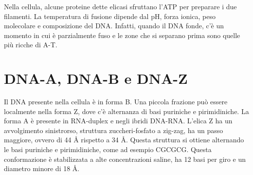 
Nella cellula, alcune proteine dette elicasi sfruttano l'ATP per preparare i due filamenti.
La temperatura di fusione dipende dal pH, forza ionica, peso molecolare e composizione del DNA.
Infatti, quando il DNA fonde, c'è un momento in cui è parzialmente fuso e le zone che si separano prima sono quelle più ricche di A-T.



\clearpage

\section{DNA-A, DNA-B e DNA-Z}

\begingroup
\begin{table}
\caption{Tipologie di DNA}
\end{table}
\endgroup

Il DNA presente nella cellula è in forma B. Una piccola frazione può essere localmente nella forma Z, dove c'è alternanza di basi puriniche e pirimidiniche. La forma A è presente in RNA-duplex e negli ibridi DNA-RNA.
L'elica Z ha un avvolgimento sinistrorso, struttura zuccheri-fosfato a zig-zag, ha un passo maggiore, ovvero di 44 \AA{} rispetto a 34 \AA.
Questa struttura si ottiene alternando le basi puriniche e pirimidiniche, come ad esempio CGCGCG.{} Questa conformazione è stabilizzata a alte concentrazioni saline, ha 12 basi per giro e un diametro minore di 18 \AA.

